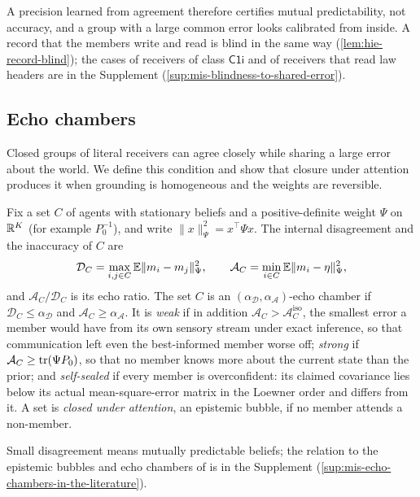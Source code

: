 A precision learned from agreement therefore certifies mutual predictability, not accuracy, and a group with a large common error looks calibrated from inside. A record that the members write and read is blind in the same way (\cref{lem:hie-record-blind}); the cases of receivers of class $\mathsf{C1i}$ and of receivers that read law headers are in the Supplement (\cref{sup:mis-blindness-to-shared-error}).

\subsection{Echo chambers}\label{sec:mis-echo}

Closed groups of literal receivers can agree closely while sharing a large error about the world. We define this condition and show that closure under attention produces it when grounding is homogeneous and the weights are reversible.

\begin{definition}\label{def:mis-echo}
Fix a set $C$ of agents with stationary beliefs and a positive-definite weight $\Psi$ on $\mathbb{R}^K$ (for example $P_0^{-1}$), and write $\lVert x\rVert_\Psi^2=x^\top\Psi x$. The internal disagreement and the inaccuracy of $C$ are
\begin{equation}\label{eq:mis-echo}
\mathcal D_C=\max_{i,j\in C}\mathbb{E}\lVert m_i-m_j\rVert_\Psi^2,\qquad\mathcal A_C=\min_{i\in C}\mathbb{E}\lVert m_i-\eta\rVert_\Psi^2,
\end{equation}
and $\mathcal A_C/\mathcal D_C$ is its echo ratio. The set $C$ is an $(\alpha_{\mathcal D},\alpha_{\mathcal A})$-echo chamber if $\mathcal D_C\le\alpha_{\mathcal D}$ and $\mathcal A_C\ge\alpha_{\mathcal A}$. It is \emph{weak} if in addition $\mathcal A_C>\mathcal A^{\mathrm{iso}}_C$, the smallest error a member would have from its own sensory stream under exact inference, so that communication left even the best-informed member worse off; \emph{strong} if $\mathcal A_C\ge\operatorname{tr}(\Psi P_0)$, so that no member knows more about the current state than the prior; and \emph{self-sealed} if every member is overconfident: its claimed covariance lies below its actual mean-square-error matrix in the Loewner order and differs from it. A set is \emph{closed under attention}, an epistemic bubble, if no member attends a non-member.
\end{definition}

Small disagreement means mutually predictable beliefs; the relation to the epistemic bubbles and echo chambers of \citet{nguyen2020echo} is in the Supplement (\cref{sup:mis-echo-chambers-in-the-literature}).

